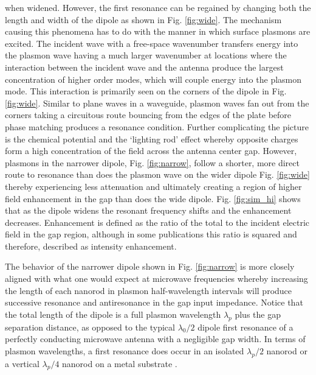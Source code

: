 \documentclass[11pt]{article}
\begin{document}
%
when widened. However, the first resonance can be regained by changing both the length and width of the dipole as shown in Fig. \ref{fig:wide}. The mechanism causing this phenomena has to do with the manner in which surface plasmons are excited. The incident wave with a free-space wavenumber transfers energy into the plasmon wave having a much larger wavenumber at locations where the interaction between the incident wave and the antenna produce the largest concentration of higher order modes, which will couple energy into the plasmon mode. This interaction is primarily seen on the corners of the dipole in Fig. \ref{fig:wide}. Similar to plane waves in a waveguide, plasmon waves fan out from the corners taking a circuitous route bouncing from the edges of the plate before phase matching produces a resonance condition. Further complicating the picture is the chemical potential and the `lighting rod' effect whereby opposite charges form a high concentration of the field across the antenna
center gap. However, plasmons in the narrower dipole, Fig. \ref{fig:narrow}, follow a shorter, more direct route to resonance than does the plasmon wave on the wider dipole Fig. \ref{fig:wide} thereby experiencing less attenuation and ultimately creating a region of higher field enhancement in the gap than does the wide dipole. Fig. \ref{fig:sim_hi} shows that as the dipole widens the resonant frequency shifts and the enhancement decreases.  Enhancement is defined as the ratio of the total to the incident electric field in the gap region, although in some publications this ratio is squared and therefore, described as intensity enhancement.

The behavior of the narrower dipole shown in Fig. \ref{fig:narrow} is more closely aligned with what one would expect at microwave frequencies whereby increasing the length of each nanorod in plasmon half-wavelength intervals will produce successive resonance and antiresonance in the gap input impedance. Notice that the total length of the dipole is a full plasmon wavelength $\lambda_p$ plus the gap separation distance, as opposed to the typical $\lambda_0/2$ dipole first resonance of a perfectly conducting microwave antenna with a negligible gap width. In terms of plasmon wavelengths, a first resonance does occur in an isolated $\lambda_p/2$ nanorod or a vertical $\lambda_p/4$ nanorod on a metal substrate \cite{Taminiau2007}.
\end{document}
